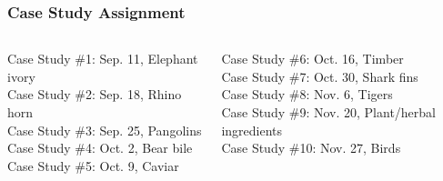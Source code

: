 \documentclass[10pt]{beamer}
\begin{document}
\begin{frame}[t]
\frametitle{Case Study Assignment}
\vspace{0.5cm}

	\begin{columns}
		\begin{column}{0.5\textwidth}
			\textcolor{myblue}{Case Study \#1: Sep. 11, Elephant ivory}\\
			\bigskip
			\textcolor{myblue}{Case Study \#2: Sep. 18, Rhino horn}\\
			\bigskip
			Case Study \#3: Sep. 25, Pangolins\\
			\bigskip
			Case Study \#4: Oct. 2, Bear bile\\
			\bigskip
			Case Study \#5: Oct. 9, Caviar\\
		\end{column}
		
		\begin{column}{0.5\textwidth}
			Case Study \#6: Oct. 16, Timber\\
			\bigskip
			Case Study \#7: Oct. 30, Shark fins\\
			\bigskip
			Case Study \#8: Nov. 6, Tigers\\
			\bigskip
			Case Study \#9: Nov. 20, Plant/herbal ingredients\\
			\bigskip
			Case Study \#10: Nov. 27, Birds\\
		\end{column}
	\end{columns}	
\end{frame}

	
\end{document}
